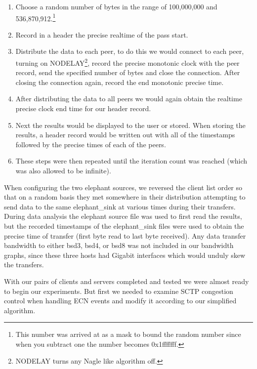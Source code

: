 \documentclass[12pt]{article}
\begin{document}
\begin{enumerate}

\item Choose a random number of bytes in the range of 100,000,000 and
  536,870,912.\footnote{This number was arrived at as a mask to bound the
  random number since when you subtract one the number becomes 0x1fffffff.}

\item Record in a header the precise realtime of the pass start.

\item Distribute the data to each peer, to do this we would connect to each peer, turning on 
NODELAY\footnote{NODELAY turns any Nagle\cite{rfc896} like algorithm off.}, record the
precise monotonic clock with the peer record, send the specified number of bytes
and close the connection. After closing the connection again, record the end monotonic 
precise time.

\item After distributing the data to all peers we would again obtain the realtime precise
clock end time for our header record.


\item Next the results would be displayed to the user or stored. When storing the
results, a header record would be written out with all of the timestamps followed
by the precise times of each of the peers.

\item These steps were then repeated until the iteration count was reached (which was
also allowed to be infinite).

\end{enumerate}

When configuring the two elephant sources, we reversed the client list order so that on a random
basis they met somewhere in their distribution attempting to send data to the same elephant\_sink at various
times during their transfers. During data analysis the elephant source file was used to first read the results, but the 
recorded timestamps of the elephant\_sink files were used to obtain the precise time of transfer (first byte
read to last byte received). Any data transfer bandwidth to either bsd3, bsd4, or bsd8 was not included in
our bandwidth graphs, since these three hosts had Gigabit interfaces which would unduly skew the
transfers.

With our pairs of clients and servers completed and tested we were almost ready to 
begin our experiments. But first we needed to examine SCTP congestion control
when handling ECN events and modify it according to our simplified algorithm.
\end{document}

